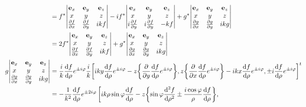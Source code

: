 \documentclass[uplatex,dvipdfmx,a4paper,11pt]{jlreq}
\theoremstyle{definition}
\begin{document}
\begin{align}
                    & = f^*\mqty|\vb{e}_x                                                                                                                                                                                                                                             & \vb{e}_y & \vb{e}_z \\ x & y & z \\ \pdv{f}{x} & \pdv{f}{y} & i kf | - i f^*\mqty|\vb{e}_x                                                                                        & \vb{e}_y & \vb{e}_z \\ x & y & z \\ i\pdv{f}{y} & i\pdv{f}{y} & - kf | + g^*\mqty|\vb{e}_x                                                                                        & \vb{e}_y & \vb{e}_z \\ x & y & z \\ \pdv{g}{x} & \pdv{g}{y} & i kg | \\
                    & = 2f^*\mqty|\vb{e}_x                                                                                                                                                                                                                                            & \vb{e}_y & \vb{e}_z \\ x & y & z \\ \pdv{f}{x} & \pdv{f}{y} & i kf | + g^*\mqty|\vb{e}_x                                                                                        & \vb{e}_y & \vb{e}_z \\ x & y & z \\ \pdv{g}{x} & \pdv{g}{y} & i kg | \\
  g\mqty|\vb{e}_x   & \vb{e}_y                                                                                                                                                                                                                                                        & \vb{e}_z            \\ x & y & z \\ \pdv{g}{x} & \pdv{g}{y} & i kg |
                    & = \frac{i}{k}\dv{f}{\rho}e^{\pm i\varphi}\frac{i}{k}\qty[i ky\dv{f}{\rho}e^{\pm i\varphi} - z\qty{\pdv{}{y}\dv{f}{\rho}e^{\pm i\varphi}}, z\qty{\pdv{}{x}\dv{f}{\rho}e^{\pm i\varphi}} - i kx\dv{f}{\rho}e^{\pm i\varphi}, \pm i\dv{f}{\rho}e^{\pm i\varphi}]^t                       \\
                    & = -\frac{1}{k^2}\dv{f}{\rho}e^{\pm 2i\varphi}\left[i k\rho\sin\varphi\dv{f}{\rho} - z\qty{\sin\varphi\dv[2]{f}{\rho} \pm \frac{i\cos\varphi}{\rho}\dv{f}{\rho}},\right.                                                                                                               \\

\end{align}
\end{document}
